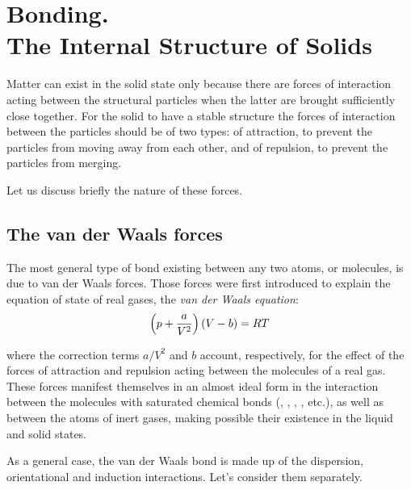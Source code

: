 

\chapter[Bonding. The Internal Structure of Solids]{Bonding.\\The Internal Structure of Solids}\label{chap:1}

Matter can exist in the solid state only because there are forces of interaction acting between the structural particles when the latter are brought sufficiently close together. For the solid to have a stable structure the forces of interaction between the particles should be of two types: of attraction, to prevent the particles from moving away from each other, and of repulsion, to prevent the particles from merging.

Let us discuss briefly the nature of these forces.

\section{The van der Waals forces}\label{sec:1_1}

The most general type of bond existing between any two atoms, or molecules, is due to van der Waals forces. Those forces were first introduced to explain the equation of state of real gases, the \textit{van der Waals equation}:
\begin{equation}\label{eq:1_1}
	\left(p + \frac{a}{V^2}\right)(V - b) = RT
\end{equation}

\noindent
where the correction terms $a/V^2$ and $b$ account, respectively, for the effect of the forces of attraction and repulsion acting between the molecules of a real gas. These forces manifest themselves in an almost ideal form in the interaction between the molecules with saturated chemical bonds (, , , , etc.), as well as between the atoms of inert gases, making possible their existence in the liquid and solid states.

As a general case, the van der Waals bond is made up of the dispersion, orientational and induction interactions. Let's consider them separately.


